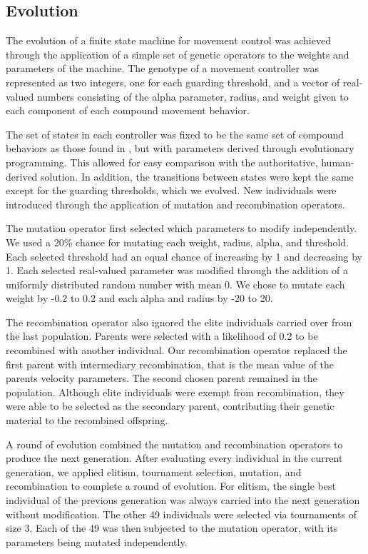 \documentclass[12pt,journal,compsoc]{IEEEtran}
\begin{document}
\subsection{Evolution}

The evolution of a finite state machine for movement control was achieved through the application of a simple set of genetic operators to the weights and parameters of the machine. The genotype of a movement controller was represented as two integers, one for each guarding threshold, and a vector of real-valued numbers consisting of the alpha parameter, radius, and weight given to each component of each compound movement behavior.

The set of states in each controller was fixed to be the same set of compound behaviors as those found in \cite{rodriguez2004extending}, but with parameters derived through evolutionary programming. This allowed for easy comparison with the authoritative, human-derived solution. In addition, the transitions between states were kept the same except for the guarding thresholds, which we evolved. New individuals were introduced through the application of mutation and recombination operators.

The mutation operator first selected which parameters to modify independently. We used a 20\% chance for mutating each weight, radius, alpha, and threshold. Each selected threshold had an equal chance of increasing by 1 and decreasing by 1. Each selected real-valued parameter was modified through the addition of a uniformly distributed random number with mean 0. We chose to mutate each weight by -0.2 to 0.2 and each alpha and radius by -20 to 20.

The recombination operator also ignored the elite individuals carried over from the last population. Parents were selected with a likelihood of 0.2 to be recombined with another individual. Our recombination operator replaced the first parent with intermediary recombination, that is the mean value of the parents velocity parameters. The second chosen parent remained in the population. Although elite individuals were exempt from recombination, they were able to be selected as the secondary parent, contributing their genetic material to the recombined offspring.

A round of evolution combined the mutation and recombination operators to produce the next generation. After evaluating every individual in the current generation, we applied elitism, tournament selection, mutation, and recombination to complete a round of evolution. For elitism, the single best individual of the previous generation was always carried into the next generation without modification. The other 49 individuals were selected via tournaments of size 3. Each of the 49 was then subjected to the mutation operator, with its parameters being mutated independently.
\end{document}
